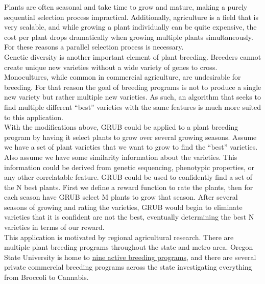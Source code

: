 \documentclass{article}[12pt]
\begin{document}
Plants are often seasonal and take time to grow and mature, making a purely sequential selection process impractical.
Additionally, agriculture is a field that is very scalable, and while growing a plant individually can be quite expensive,
the cost per plant drops dramatically when growing multiple plants simultaneously.
For these reasons a parallel selection process is necessary. \\

Genetic diversity is another important element of plant breeding.
Breeders cannot create unique new varieties without a wide variety of genes to cross.
Monocultures, while common in commercial agriculture, are undesirable for breeding.
For that reason the goal of breeding programs is not to produce a single new variety but rather multiple new varieties.
As such, an algorithm that seeks to find multiple different ``best'' varieties with the same features is much more suited to this application. \\

With the modifications above, GRUB could be applied to a plant breeding program by having it select plants to grow over several growing seasons.
Assume we have a set of plant varieties that we want to grow to find the ``best'' varieties.
Also assume we have some similarity information about the varieties.
This information could be derived from genetic sequencing, phenotypic properties, or any other correlatable feature.
GRUB could be used to confidently find a set of the N best plants.
First we define a reward function to rate the plants, then for each season have GRUB select M plants to grow that season.
After several seasons of growing and rating the varieties, GRUB would begin to eliminate varieties that it is confident are not the best,
eventually determining the best N varieties in terms of our reward. \\

This application is motivated by regional agricultural research.
There are multiple plant breeding programs throughout the state and metro area.
Oregon State University is home to \href{https://plantbreeding.oregonstate.edu/}{nine active breeding programs},
and there are several private commercial breeding programs across the state investigating everything from Broccoli to Cannabis.
\end{document}
